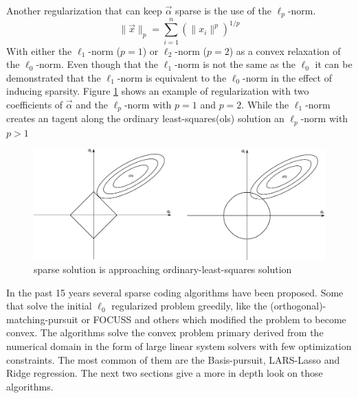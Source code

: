 Another regularization that can keep $\vec{\alpha}$ sparse is the use of the
$\ell_p$-norm.
\begin{equation*}
\lVert \vec{x}\rVert_p = \sum_{i=1}^n\left(\lVert x_i \lVert^p\right)^{1/p}
\end{equation*}
With either the $\ell_1$-norm ($p=1$) or $\ell_2$-norm ($p=2$) as a
convex relaxation of the $\ell_0$-norm. Even though that the $\ell_1$-norm is
not the same as the $\ell_0$ it can be demonstrated that the $\ell_1$-norm is
equivalent to the $\ell_0$-norm in the effect of inducing sparsity. 
Figure \ref{fig:sparse} shows an example of regularization with two coefficients
of $\vec{\alpha}$ and the $\ell_p$-norm with $p=1$ and $p=2$. While the
$\ell_1$-norm creates an tagent along the ordinary least-squares(ols) solution
an $\ell_p$-norm with $p>1$ 
\begin{figure}[h]
\centering
\includegraphics[width = 1.0\textwidth]{images/regularization.pdf}
\caption{sparse solution is approaching ordinary-least-squares solution}
\label{fig:sparse}
\end{figure}

In the past 15 years several sparse coding algorithms have been proposed. Some
that solve the initial $\ell_0$ regularized problem greedily, like
the (orthogonal)-matching-pursuit or FOCUSS and others which modified the
problem to become convex. The algorithms solve the convex problem  primary
derived from the numerical domain in the form of large linear system solvers
with few optimization constraints. The most common of them are the
Basis-pursuit, LARS-Lasso and Ridge regression. The next two sections give a
more in depth look on those algorithms. 




